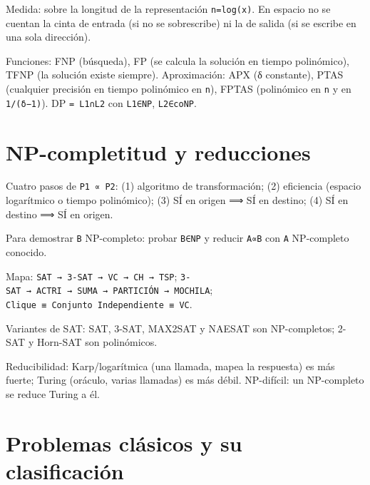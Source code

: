 \documentclass[12pt]{book} %
\begin{document}
Medida: sobre la longitud de la representación \texttt{n=log(x)}. En
espacio no se cuentan la cinta de entrada (si no se sobrescribe) ni la
de salida (si se escribe en una sola dirección).

Funciones: FNP (búsqueda), FP (se calcula la solución en tiempo
polinómico), TFNP (la solución existe siempre). Aproximación: APX (δ
constante), PTAS (cualquier precisión en tiempo polinómico en
\texttt{n}), FPTAS (polinómico en \texttt{n} y en \texttt{1/(δ−1)}). DP
\texttt{=\ L1∩L2} con \texttt{L1∈NP}, \texttt{L2∈coNP}.

\hypertarget{np-completitud-y-reducciones}{%
\section{NP-completitud y
reducciones}\label{np-completitud-y-reducciones}}

Cuatro pasos de \texttt{P1\ ∝\ P2}: (1) algoritmo de transformación; (2)
eficiencia (espacio logarítmico o tiempo polinómico); (3) SÍ en origen ⟹
SÍ en destino; (4) SÍ en destino ⟹ SÍ en origen.

Para demostrar \texttt{B} NP-completo: probar \texttt{B∈NP} y reducir
\texttt{A∝B} con \texttt{A} NP-completo conocido.

Mapa: \texttt{SAT\ →\ 3-SAT\ →\ VC\ →\ CH\ →\ TSP};
\texttt{3-SAT\ →\ ACTRI\ →\ SUMA\ →\ PARTICIÓN\ →\ MOCHILA};
\texttt{Clique\ ≡\ Conjunto\ Independiente\ ≡\ VC}.

Variantes de SAT: SAT, 3-SAT, MAX2SAT y NAESAT son NP-completos; 2-SAT y
Horn-SAT son polinómicos.

Reducibilidad: Karp/logarítmica (una llamada, mapea la respuesta) es más
fuerte; Turing (oráculo, varias llamadas) es más débil. NP-difícil: un
NP-completo se reduce Turing a él.

\hypertarget{problemas-cluxe1sicos-y-su-clasificaciuxf3n}{%
\section{Problemas clásicos y su
clasificación}\label{problemas-cluxe1sicos-y-su-clasificaciuxf3n}}
\end{document}
